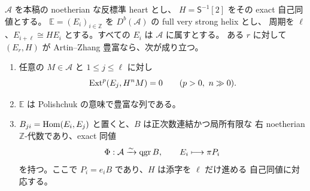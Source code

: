 \begin{lemma}\label{lem:ample-helix-reconstruction}
$\mathcal A$ を本稿の noetherian な反標準 heart とし、
$H=\mathsf S^{-1}[2]$ をその exact 自己同値とする。
$\mathbb E=(E_i)_{i\in\mathbb Z}$ を $D^b(\mathcal A)$ の full very strong helix とし、
周期を $\ell$、$E_{i+\ell}\cong HE_i$ とする。すべての $E_i$ は $\mathcal A$ に属すとする。
ある $r$ に対して $(E_r,H)$ が Artin--Zhang 豊富なら、次が成り立つ。
\begin{enumerate}
\item 任意の $M\in\mathcal A$ と $1\le j\le\ell$ に対し
\[
 \Ext^p(E_j,H^nM)=0\qquad(p>0,\ n\gg0).
\]
\item $\mathbb E$ は Polishchuk の意味で豊富な列である。
\item $B_{ji}=\operatorname{Hom}(E_i,E_j)$ と置くと、$B$ は正次数連結かつ局所有限な
右 noetherian $\mathbb Z$-代数であり、exact 同値
\[
 \Phi:\mathcal A\xrightarrow{\sim}\operatorname{qgr} B,
 \qquad E_i\longmapsto\pi P_i
\]
を持つ。ここで $P_i=e_iB$ であり、$H$ は添字を $\ell$ だけ進める
自己同値に対応する。
\end{enumerate}
\end{lemma}
